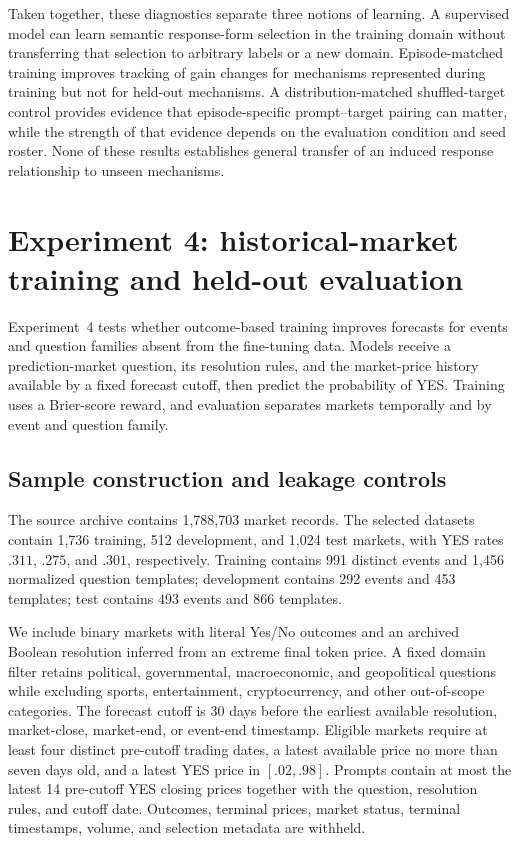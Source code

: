Taken together, these diagnostics separate three notions of learning.
A supervised model can learn semantic response-form selection in the training domain without transferring that selection to arbitrary labels or a new domain.
Episode-matched training improves tracking of gain changes for mechanisms represented during training but not for held-out mechanisms.
A distribution-matched shuffled-target control provides evidence that episode-specific prompt--target pairing can matter, while the strength of that evidence depends on the evaluation condition and seed roster.
None of these results establishes general transfer of an induced response relationship to unseen mechanisms.

\section{Experiment 4: historical-market training and held-out evaluation}
\label{app:exp4}
\label{app:exp3b-protocol}

Experiment~4 tests whether outcome-based training improves forecasts for events and question families absent from the fine-tuning data.
Models receive a prediction-market question, its resolution rules, and the market-price history available by a fixed forecast cutoff, then predict the probability of YES.
Training uses a Brier-score reward, and evaluation separates markets temporally and by event and question family.

\subsection{Sample construction and leakage controls}

The source archive contains 1,788,703 market records.
The selected datasets contain 1,736 training, 512 development, and 1,024 test markets, with YES rates $.311$, $.275$, and $.301$, respectively.
Training contains 991 distinct events and 1,456 normalized question templates; development contains 292 events and 453 templates; test contains 493 events and 866 templates.

We include binary markets with literal Yes/No outcomes and an archived Boolean resolution inferred from an extreme final token price.
A fixed domain filter retains political, governmental, macroeconomic, and geopolitical questions while excluding sports, entertainment, cryptocurrency, and other out-of-scope categories.
The forecast cutoff is 30 days before the earliest available resolution, market-close, market-end, or event-end timestamp.
Eligible markets require at least four distinct pre-cutoff trading dates, a latest available price no more than seven days old, and a latest YES price in \([.02,.98]\).
Prompts contain at most the latest 14 pre-cutoff YES closing prices together with the question, resolution rules, and cutoff date.
Outcomes, terminal prices, market status, terminal timestamps, volume, and selection metadata are withheld.

